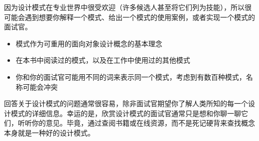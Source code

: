 
因为设计模式在专业世界中很受欢迎（许多候选人甚至将它们列为技能），所以很可能会遇到想要你解释一个模式、给出一个模式的使用案例，或者实现一个模式的面试官。


\begin{itemize}
\item
模式作为可重用的面向对象设计概念的基本理念

\item
在本书中阅读过的模式，以及在工作中使用过的其他模式

\item
你和你的面试官可能用不同的词来表示同一个模式，考虑到有数百种模式，名称可能会冲突
\end{itemize}


回答关于设计模式的问题通常很容易，除非面试官期望你了解人类所知的每一个设计模式的详细信息。幸运的是，欣赏设计模式的面试官通常只是想和你聊一聊它们，听听你的意见。毕竟，通过查阅书籍或在线资源，而不是死记硬背来查找概念本身就是一种好的设计模式。


